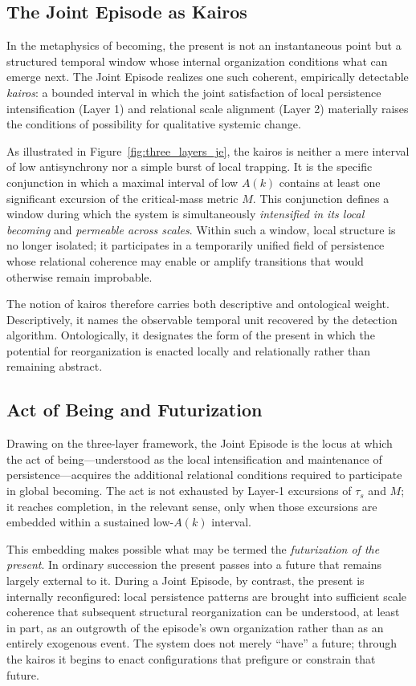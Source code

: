\subsection{The Joint Episode as Kairos}

In the metaphysics of becoming, the present is not an instantaneous point but a structured temporal window whose internal organization conditions what can emerge next. The Joint Episode realizes one such coherent, empirically detectable \textit{kairos}: a bounded interval in which the joint satisfaction of local persistence intensification (Layer 1) and relational scale alignment (Layer 2) materially raises the conditions of possibility for qualitative systemic change.

As illustrated in Figure~\ref{fig:three_layers_je}, the kairos is neither a mere interval of low antisynchrony nor a simple burst of local trapping. It is the specific conjunction in which a maximal interval of low $A(k)$ contains at least one significant excursion of the critical-mass metric $M$. This conjunction defines a window during which the system is simultaneously \emph{intensified in its local becoming} and \emph{permeable across scales}. Within such a window, local structure is no longer isolated; it participates in a temporarily unified field of persistence whose relational coherence may enable or amplify transitions that would otherwise remain improbable.

The notion of kairos therefore carries both descriptive and ontological weight. Descriptively, it names the observable temporal unit recovered by the detection algorithm. Ontologically, it designates the form of the present in which the potential for reorganization is enacted locally and relationally rather than remaining abstract.

\subsection{Act of Being and Futurization}

Drawing on the three-layer framework, the Joint Episode is the locus at which the act of being---understood as the local intensification and maintenance of persistence---acquires the additional relational conditions required to participate in global becoming. The act is not exhausted by Layer-1 excursions of $\tau_s$ and $M$; it reaches completion, in the relevant sense, only when those excursions are embedded within a sustained low-$A(k)$ interval.

This embedding makes possible what may be termed the \textit{futurization of the present}. In ordinary succession the present passes into a future that remains largely external to it. During a Joint Episode, by contrast, the present is internally reconfigured: local persistence patterns are brought into sufficient scale coherence that subsequent structural reorganization can be understood, at least in part, as an outgrowth of the episode's own organization rather than as an entirely exogenous event. The system does not merely ``have'' a future; through the kairos it begins to enact configurations that prefigure or constrain that future.

